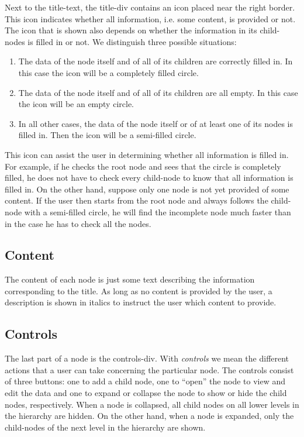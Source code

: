 Next to the title-text, the title-div contains an icon placed near the right border. This icon indicates whether all information, i.e. some content, is provided or not. The icon that is shown also depends on whether the information in its child-nodes is filled in or not. We distinguish three possible situations:
\begin{enumerate}
	\item The data of the node itself and of all of its children are correctly filled in. In this case the icon will be a completely filled circle.
	\item The data of the node itself and of all of its children are all empty. In this case the icon will be an empty circle.
	\item In all other cases, the data of the node itself or of at least one of its nodes is filled in. Then the icon will be a semi-filled circle.
\end{enumerate}
This icon can assist the user in determining whether all information is filled in. For example, if he checks the root node and sees that the circle is completely filled, he does not have to check every child-node to know that all information is filled in. On the other hand, suppose only one node is not yet provided of some content. If the user then starts from the root node and always follows the child-node with a semi-filled circle, he will find the incomplete node much faster than in the case he has to check all the nodes.



\subsection{Content}\label{sec:content}
The content of each node is just some text describing the information corresponding to the title. As long as no content is provided by the user, a description is shown in italics to instruct the user which content to provide.



\subsection{Controls}\label{sec:controls}
The last part of a node is the controls-div. With \textit{controls} we mean the different actions that a user can take concerning the particular node. The controls consist of three buttons: one to add a child node, one to ``open'' the node to view and edit the data and one to expand or collapse the node to show or hide the child nodes, respectively. When a node is collapsed, all child nodes on all lower levels in the hierarchy are hidden. On the other hand, when a node is expanded, only the child-nodes of the next level in the hierarchy are shown.



